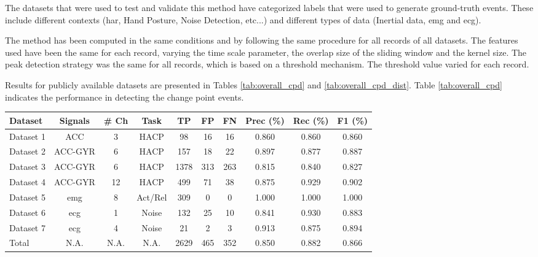 The datasets that were used to test and validate this method have categorized labels that were used to generate ground-truth events. These include different contexts (\gls{har}, Hand Posture, Noise Detection, etc...) and different types of data (Inertial data, \gls{emg} and \gls{ecg}).
\par
The method has been computed in the same conditions and by following the same procedure for all records of all datasets. The features used have been the same for each record, varying the time scale parameter, the overlap size of the sliding window and the kernel size. The peak detection strategy was the same for all records, which is based on a threshold mechanism. The threshold value varied for each record.  
\par
Results for publicly available datasets are presented in Tables \ref{tab:overall_cpd} and \ref{tab:overall_cpd_dist}. Table \ref{tab:overall_cpd} indicates the performance in detecting the change point events. 

\begin{table*}
	\begin{center}
		\begin{tabular}{lccccccccc}
			\toprule
			Dataset & Signals & \# Ch & Task & TP & FP & FN & Prec (\%) & Rec (\%) & F1 (\%) \\
			\toprule
			Dataset 1 & ACC & 3 & HACP & 98 & 16 & 16 & 0.860 & 0.860 & 0.860 \\
			Dataset 2 & ACC-GYR & 6 & HACP & 157 & 18 & 22 & 0.897 & 0.877 & 0.887 \\
			Dataset 3 & ACC-GYR & 6 & HACP & 1378 & 313 & 263 & 0.815 & 0.840 & 0.827 \\
			Dataset 4 & ACC-GYR & 12 & HACP & 499 & 71 & 38 & 0.875 & 0.929 & 0.902 \\
			Dataset 5 & \gls{emg} & 8 & Act/Rel & 309 & 0 & 0 & 1.000 & 1.000 & 1.000 \\
			Dataset 6  & \gls{ecg} & 1 & Noise & 132 & 25 & 10 & 0.841 & 0.930 & 0.883 \\
			Dataset 7  & \gls{ecg} & 4 & Noise & 21 & 2 & 3 & 0.913 & 0.875 & 0.894 \\
			\midrule
			Total & N.A. & N.A. & N.A. & 2629 & 465 & 352 & 0.850 & 0.882 & 0.866 \\
			\bottomrule
		\end{tabular}
	\end{center}
	\caption{Overall results for the performance of the method on novelty segmentation. The dimension of the records is presented on the column \textit{\# Ch}, as well as the types of signals used and the task in which  applied (HACP - Human Activity Change Point detection; Act/Rel - Activation/Relaxation of the \gls{emg} detection and Noise detection). The overall measures of Recall and Precision were micro-averaged.}
	\label{tab:overall_cpd}
\end{table*}


